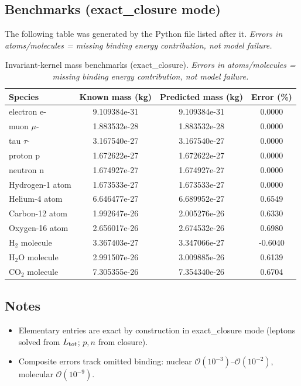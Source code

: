 \documentclass[10pt,reprint,aps,onecolumn,nofootinbib]{revtex4-2}
\begin{document}
    \subsection{Benchmarks (exact\_closure mode)}
    \label{sec:benchmarks-exact-closure}
    The following table was generated by the Python file listed after it.
    \emph{Errors in atoms/molecules = missing binding energy contribution, not model failure.}

    \begin{table}[H]
    \centering
    \caption{Invariant-kernel mass benchmarks (exact\_closure). \emph{Errors in atoms/molecules = missing binding energy contribution, not model failure.}}
    \begin{tabular}{lccc}
    \toprule
    Species & Known mass (kg) & Predicted mass (kg) & Error (\%)\\
    \midrule
    electron e- & 9.109384e-31 & 9.109384e-31 & 0.0000\\
    muon $\mu$- & 1.883532e-28 & 1.883532e-28 & 0.0000\\
    tau $\tau$- & 3.167540e-27 & 3.167540e-27 & 0.0000\\
    proton p & 1.672622e-27 & 1.672622e-27 & 0.0000\\
    neutron n & 1.674927e-27 & 1.674927e-27 & 0.0000\\
    Hydrogen-1 atom & 1.673533e-27 & 1.673533e-27 & 0.0000\\
    Helium-4 atom & 6.646477e-27 & 6.689952e-27 & 0.6549\\
    Carbon-12 atom & 1.992647e-26 & 2.005276e-26 & 0.6330\\
    Oxygen-16 atom & 2.656017e-26 & 2.674532e-26 & 0.6980\\
    H$_2$ molecule & 3.367403e-27 & 3.347066e-27 & -0.6040\\
    H$_2$O molecule & 2.991507e-26 & 3.009885e-26 & 0.6139\\
    CO$_2$ molecule & 7.305355e-26 & 7.354340e-26 & 0.6704\\
    \bottomrule
    \end{tabular}\label{tab:benchmarks-exact-closure}
    \end{table}

    \subsection*{Notes}
    \begin{itemize}
    \item Elementary entries are exact by construction in exact\_closure mode (leptons solved from $L_{\textrm tot}$; $p,n$ from closure).
    \item Composite errors track omitted binding: nuclear $\mathcal O(10^{-3})$–$\mathcal O(10^{-2})$, molecular $\mathcal O(10^{-9})$.
    \end{itemize}
\end{document}
